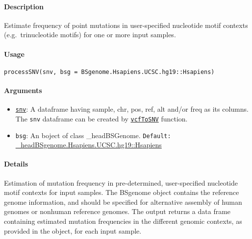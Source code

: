\documentclass[]{article}
\providecommand{\tightlist}{%
  \setlength{\itemsep}{0pt}\setlength{\parskip}{0pt}}
\let\oldparagraph\paragraph
\renewcommand{\paragraph}[1]{\oldparagraph{#1}\mbox{}}
\begin{document}
\paragraph{\texorpdfstring{\textbf{Description}}{Description}}\label{description-2}

Estimate frequency of point mutations in user-specified nucleotide motif
contexts (e.g.~trinucleotide motifs) for one or more input samples.

\paragraph{\texorpdfstring{\textbf{Usage}}{Usage}}\label{usage-2}

\texttt{processSNV(snv,\ bsg\ =\ BSgenome.Hsapiens.UCSC.hg19::Hsapiens)}

\paragraph{\texorpdfstring{\textbf{Arguments
}}{Arguments }}\label{arguments-2}

\begin{itemize}
\tightlist
\item
  \protect\hyperlink{snv}{\texttt{snv}}: A dataframe having sample, chr,
  pos, ref, alt and/or freq as its columns. The \texttt{snv} dataframe
  can be created by \protect\hyperlink{vcfToSNV}{\texttt{vcfToSNV}}
  function.
\item
  \texttt{bsg}: An boject of class \BSgenome_head{BSGenome}. \texttt{Default:}
  \href{https://bioconductor.org/packages/release/data/annotation/html/BSgenome.Hsapiens.UCSC.hg19.html}{\BSgenome_head{BSgenome.Hsapiens.UCSC.hg19::Hsapiens}}
\end{itemize}

\paragraph{\texorpdfstring{\textbf{Details}}{Details}}\label{details-2}

Estimation of mutation frequency in pre-determined, user-specified
nucleotide motif contexts for input samples. The BSgenome object
contains the reference genome information, and should be specified for
alternative assembly of human genomes or nonhuman reference genomes. The
output returns a data frame containing estimated mutation frequencies in
the different genomic contexts, as provided in the  object, for
each input sample.
\end{document}
